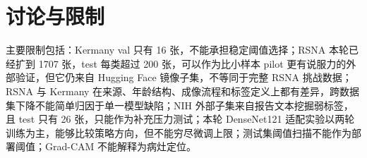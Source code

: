 \chapter{讨论与限制}

主要限制包括：Kermany val 只有 16 张，不能承担稳定阈值选择；RSNA 本轮已经扩到 1707 张，test 每类超过 200 张，可以作为比小样本 pilot 更有说服力的外部验证，但它仍来自 Hugging Face 镜像子集，不等同于完整 RSNA 挑战数据；RSNA 与 Kermany 在来源、年龄结构、成像流程和标签定义上都有差异，跨数据集下降不能简单归因于单一模型缺陷；NIH 外部子集来自报告文本挖掘弱标签，且 test 只有 26 张，只能作为补充压力测试；本轮 DenseNet121 适配实验以两轮训练为主，能够比较策略方向，但不能穷尽微调上限；测试集阈值扫描不能作为部署阈值；Grad-CAM 不能解释为病灶定位。
